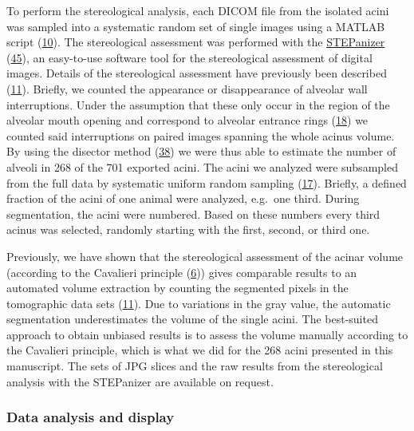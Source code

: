 \documentclass[
  american,
]{article}
\begin{document}
To perform the stereological analysis, each DICOM file from the isolated acini was sampled into a systematic random set of single images using a MATLAB script (\protect\hyperlink{ref-12Z2YPzm8}{10}).
The stereological assessment was performed with the \href{http://stepanizer.com/}{STEPanizer} (\protect\hyperlink{ref-nPoQ2EIB}{45}), an easy-to-use software tool for the stereological assessment of digital images.
Details of the stereological assessment have previously been described (\protect\hyperlink{ref-7YLeeyu}{11}).
Briefly, we counted the appearance or disappearance of alveolar wall interruptions.
Under the assumption that these only occur in the region of the alveolar mouth opening and correspond to alveolar entrance rings (\protect\hyperlink{ref-QiAxY2i3}{18}) we counted said interruptions on paired images spanning the whole acinus volume.
By using the disector method (\protect\hyperlink{ref-FJ9FoB4m}{38}) we were thus able to estimate the number of alveoli in 268 of the 701 exported acini.
The acini we analyzed were subsampled from the full data by systematic uniform random sampling (\protect\hyperlink{ref-dNc8FfNn}{17}).
Briefly, a defined fraction of the acini of one animal were analyzed, e.g.~one third.
During segmentation, the acini were numbered.
Based on these numbers every third acinus was selected, randomly starting with the first, second, or third one.

Previously, we have shown that the stereological assessment of the acinar volume (according to the Cavalieri principle (\protect\hyperlink{ref-FE9HLB4f}{6})) gives comparable results to an automated volume extraction by counting the segmented pixels in the tomographic data sets (\protect\hyperlink{ref-7YLeeyu}{11}).
Due to variations in the gray value, the automatic segmentation underestimates the volume of the single acini.
The best-suited approach to obtain unbiased results is to assess the volume manually according to the Cavalieri principle, which is what we did for the 268 acini presented in this manuscript.
The sets of JPG slices and the raw results from the stereological analysis with the STEPanizer are available on request.

\hypertarget{data-analysis-and-display}{%
\subsubsection{Data analysis and display}\label{data-analysis-and-display}}
\end{document}
